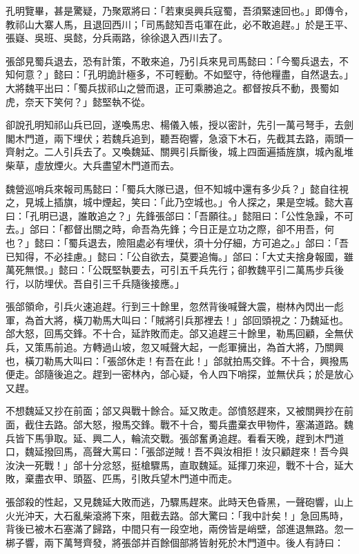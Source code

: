 孔明覽畢，甚是驚疑，乃聚眾將曰：「若東吳興兵寇蜀，吾須緊速回也。」即傳令，教祁山大寨人馬，且退回西川；「司馬懿知吾屯軍在此，必不敢追趕。」於是王平、張嶷、吳班、吳懿，分兵兩路，徐徐退入西川去了。

張郃見蜀兵退去，恐有計策，不敢來追，乃引兵來見司馬懿曰：「今蜀兵退去，不知何意？」懿曰：「孔明詭計極多，不可輕動。不如堅守，待他糧盡，自然退去。」大將魏平出曰：「蜀兵拔祁山之營而退，正可乘勝追之。都督按兵不動，畏蜀如虎，奈天下笑何？」懿堅執不從。

卻說孔明知祁山兵已回，遂喚馬忠、楊儀入帳，授以密計，先引一萬弓弩手，去劍閣木門道，兩下埋伏；若魏兵追到，聽吾砲響，急滾下木石，先截其去路，兩頭一齊射之。二人引兵去了。又喚魏延、關興引兵斷後，城上四面遍插旌旗，城內亂堆柴草，虛放煙火。大兵盡望木門道而去。

魏營巡哨兵來報司馬懿曰：「蜀兵大隊已退，但不知城中還有多少兵？」懿自往視之，見城上插旗，城中煙起，笑曰：「此乃空城也。」令人探之，果是空城。懿大喜曰：「孔明已退，誰敢追之？」先鋒張郃曰：「吾願往。」懿阻曰：「公性急躁，不可去。」郃曰：「都督出關之時，命吾為先鋒；今日正是立功之際，卻不用吾，何也？」懿曰：「蜀兵退去，險阻處必有埋伏，須十分仔細，方可追之。」郃曰：「吾已知得，不必挂慮。」懿曰：「公自欲去，莫要追悔。」郃曰：「大丈夫捨身報國，雖萬死無恨。」懿曰：「公既堅執要去，可引五千兵先行；卻教魏平引二萬馬步兵後行，以防埋伏。吾自引三千兵隨後接應。」

張郃領命，引兵火速追趕。行到三十餘里，忽然背後喊聲大震，樹林內閃出一彪軍，為首大將，橫刀勒馬大叫曰：「賊將引兵那裡去！」郃回頭視之：乃魏延也。郃大怒，回馬交鋒。不十合，延詐敗而走。郃又追趕三十餘里，勒馬回顧，全無伏兵，又策馬前追。方轉過山坡，忽又喊聲大起，一彪軍擁出，為首大將，乃關興也，橫刀勒馬大叫曰：「張郃休走！有吾在此！」郃就拍馬交鋒。不十合，興撥馬便走。郃隨後追之。趕到一密林內，郃心疑，令人四下哨探，並無伏兵；於是放心又趕。

不想魏延又抄在前面；郃又與戰十餘合。延又敗走。郃憤怒趕來，又被關興抄在前面，截住去路。郃大怒，撥馬交鋒。戰不十合，蜀兵盡棄衣甲物件，塞滿道路。魏兵皆下馬爭取。延、興二人，輪流交戰。張郃奮勇追趕。看看天晚，趕到木門道口，魏延撥回馬，高聲大罵曰：「張郃逆賊！吾不與汝相拒！汝只顧趕來！吾今與汝決一死戰！」郃十分忿怒，挺槍驟馬，直取魏延。延揮刀來迎，戰不十合，延大敗，棄盡衣甲、頭盔、匹馬，引敗兵望木門道中而走。

張郃殺的性起，又見魏延大敗而逃，乃驟馬趕來。此時天色昏黑，一聲砲響，山上火光沖天，大石亂柴滾將下來，阻截去路。郃大驚曰：「我中計矣！」急回馬時，背後已被木石塞滿了歸路，中間只有一段空地，兩傍皆是峭壁，郃進退無路。忽一梆子響，兩下萬弩齊發，將張郃并百餘個部將皆射死於木門道中。後人有詩曰：

